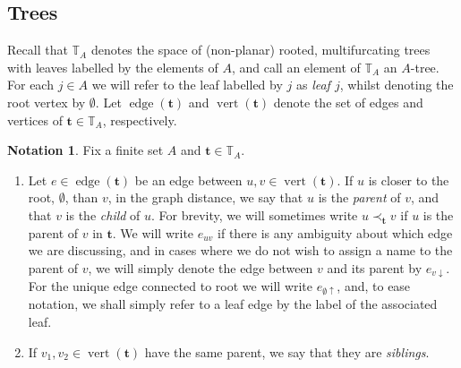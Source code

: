 \documentclass[a4paper, final]{amsart}
\theoremstyle{plain}
\theoremstyle{definition}
\newtheorem{nota}[thm]{Notation}
\newcommand{\tree}[1][t]{\boldsymbol{#1}}
\newcommand{\T}{\mathbb{T}}
\DeclareMathOperator{\edge}{edge}
\DeclareMathOperator{\vertices}{vert}
\begin{document}
\subsection{Trees}
%
Recall that $\T_A$ denotes the space of (non-planar) rooted, multifurcating trees with leaves labelled by the elements of $A$, and call an element of $\T_A$ an $A$-tree.
For each $j \in A$ we will refer to the leaf labelled by $j$ as \textit{leaf $j$}, whilst denoting the root vertex by $\emptyset$.
Let $\edge(\tree)$ and $\vertices(\tree)$ denote the set of edges and vertices of $\tree \in \T_A$, respectively.
%
\begin{nota} Fix a finite set $A$ and $\tree \in \T_A$.
  \begin{enumerate}
    \item Let $e \in \edge(\tree)$ be an edge between $u, v \in \vertices(\tree)$.
      If $u$ is closer to the root, $\emptyset$, than $v$, in the graph distance, we say that $u$ is the \textit{parent} of $v$, and that $v$ is the \textit{child} of $u$.
      For brevity, we will sometimes write $u \prec_{\tree} v$ if $u$ is the parent of $v$ in $\tree$.
      We will write $e_{uv}$ if there is any ambiguity about which edge we are discussing, and in cases where we do not wish to assign a name to the parent of $v$, we will simply denote the edge between $v$ and its parent by $e_{v \downarrow}$.
      For the unique edge connected to root we will write $e_{\emptyset \uparrow}$, and, to ease notation, we shall simply refer to a leaf edge by the label of the associated leaf.
    \item If $v_1, v_2 \in \vertices(\tree)$ have the same parent, we say that they are \textit{siblings}.

\end{enumerate}
\end{nota}
\end{document}
